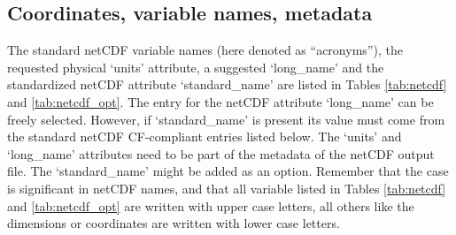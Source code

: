 \documentclass[times,doublespace]{fldauth}
\begin{document}
{\begin{appendix}
\subsection{Coordinates, variable names, metadata}
The standard netCDF variable names (here denoted as ``acronyms''), the requested physical `units' attribute, a suggested `long\_name' and the standardized netCDF attribute `standard\_name' are listed in Tables \ref{tab:netcdf} and \ref{tab:netcdf_opt}. The entry for the netCDF attribute `long\_name' can be freely selected. However, if `standard\_name' is present its value must come from the standard netCDF  CF-compliant entries listed below. The `units' and `long\_name' attributes need to be part of the metadata of the netCDF output file. The `standard\_name' might be added as an option.
Remember that the case is significant in netCDF names, and that all variable listed in Tables \ref{tab:netcdf} and \ref{tab:netcdf_opt} are written with upper case letters, all others like the dimensions or coordinates are written with lower case letters.


\end{appendix}}
\end{document}
